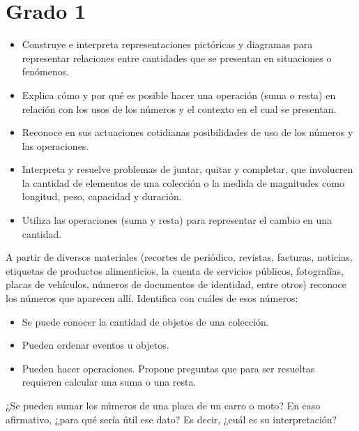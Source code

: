 \section{Grado 1}\label{grado:1}


\evidencias

\begin{itemize}
  \item Construye e interpreta representaciones pictóricas y diagramas para representar relaciones entre cantidades que se presentan en situaciones o fenómenos.
  \item Explica cómo y por qué es posible hacer una operación (suma o resta) en relación con los usos de los números y el contexto en el cual se presentan.
  \item Reconoce en sus actuaciones cotidianas posibilidades de uso de los números y las operaciones.
  \item Interpreta y resuelve problemas de juntar, quitar y completar, que involucren la cantidad de elementos de una colección o la medida de magnitudes como longitud, peso, capacidad y duración.
  \item Utiliza las operaciones (suma y resta) para representar el cambio en una cantidad.
\end{itemize}

\ejemplo

A partir de diversos materiales (recortes de periódico, revistas, facturas, noticias, etiquetas de productos alimenticios, la cuenta de servicios públicos, fotografías, placas de vehículos, números de documentos de identidad, entre otros) reconoce los números que aparecen allí. Identifica con cuáles de esos números:

\begin{itemize}
  \item Se puede conocer la cantidad de objetos de una colección.
  \item Pueden ordenar eventos u objetos.
  \item Pueden hacer operaciones. Propone preguntas que para ser resueltas requieren calcular una suma o una resta.
\end{itemize}
¿Se pueden sumar los números de una placa de un carro o moto? En caso afirmativo, ¿para qué sería útil ese dato? Es decir, ¿cuál es su interpretación?

